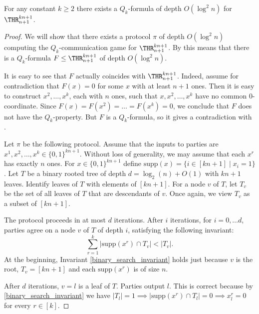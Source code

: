 \begin{corollary}
\label{weak}
For any constant $k \ge 2$ there exists 
%
a $Q_k$-formula of depth $O(\log^2 n)$  %
for $\THR^{kn + 1}_{n + 1}$.
\end{corollary}
\begin{proof}
We will show that there exists 
%
a protocol $\pi$ of depth $O(\log^2 n)$  %
computing the  $Q_k$-communication game for $\THR^{kn + 1}_{n + 1}$. By  this means that there is 
%
%
a $Q_k$-formula $F\le \THR^{kn + 1}_{n + 1}$
of depth $O(\log^2 n)$.   %

It is easy to see that $F$ actually coincides with $\THR^{kn + 1}_{n + 1}$. Indeed, assume for contradiction that $F(x) = 0$ for some $x$ with at least $n + 1$ ones. Then it is easy to construct $x^2, \ldots, x^k$, each with $n$ ones, such that $x, x^2, \ldots, x^k$ have no common $0$-coordinate. Since $F(x) = F(x^2) = \ldots = F(x^k) = 0$, we conclude that $F$ does not have the $Q_k$-property. But $F$ is a $Q_k$-formula, so  it gives a contradiction with .




Let $\pi$ be the following protocol. Assume that the inputs to parties are $x^1, x^2, \ldots, x^k \in \{0, 1\}^{kn + 1}$. Without loss of generality, we may assume that each $x^r$ has exactly $n$ ones. For $x\in\{0, 1\}^{kn + 1}$ define $\mathrm{supp}(x) = \{i \in [kn + 1] \mid x_i = 1\}$. Let $T$ be a binary rooted tree of depth $d = \log_2(n) + O(1)$ with $kn + 1$ leaves. Identify leaves of $T$ with elements of $[kn + 1]$. For a node $v$ of $T$, let $T_v$ be the set of all leaves of $T$ that are descendants of $v$. Once again, we view $T_v$ as a subset of $[kn + 1]$.

The protocol proceeds in at most $d$ iterations. After $i$ iterations, for $i = 0, \ldots d$, parties agree on a node $v$ of $T$ of depth $i$, satisfying the following invariant:
\begin{equation}
\label{binary_search_invariant}
\sum\limits_{r = 1}^k \left|\mathrm{supp}(x^r) \cap T_v\right| < |T_v|. 
\end{equation}
At the beginning, Invariant \eqref{binary_search_invariant} holds just because $v$ is the root, $T_v = [kn + 1]$ and each $\mathrm{supp}(x^r)$ is of size  $n$. 

After $d$ iterations, $v = l$ is a leaf of $T$. Parties output $l$. This is correct because by \eqref{binary_search_invariant} we have $|T_l| = 1 \implies  |\mathrm{supp}(x^r) \cap T_l| = 0 \implies x_l^r = 0$ for every $r\in [k]$. 


\end{proof}
